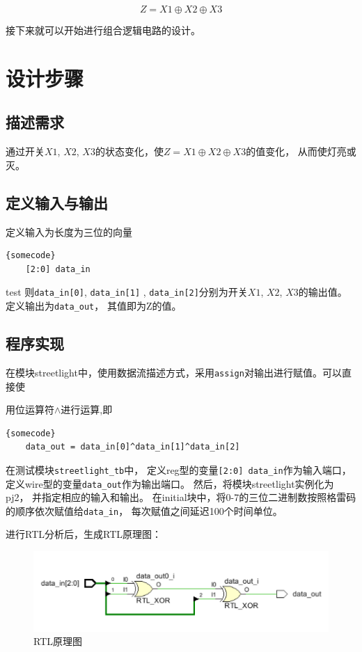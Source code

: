 \documentclass[UTF8]{article}
\begin{document}
$$Z = X1\oplus X2\oplus X3$$

接下来就可以开始进行组合逻辑电路的设计。

\section{设计步骤}
\subsection{描述需求}

通过开关$X1$, $X2$, $X3$的状态变化，使$Z = X1⊕X2⊕X3$的值变化，
从而使灯亮或灭。

\subsection{定义输入与输出}

定义输入为长度为三位的向量 

\lstset{language=verilog}
\begin{lstlisting}[frame=tb]{somecode}
    [2:0] data_in
\end{lstlisting}

{test}
则\lstinline{data_in[0]},
\lstinline$data_in[1]$ , \lstinline$data_in[2]$分别为开关$X1$, $X2$, $X3$的输出值。
定义输出为\lstinline$data_out$，
其值即为Z的值。

\subsection{程序实现}

在模块streetlight中，使用数据流描述方式，采用\lstinline{assign}对输出进行赋值。可以直接使

用位运算符$\wedge$进行运算,即
\lstset{language=verilog}
\begin{lstlisting}[frame=tb]{somecode}
    data_out = data_in[0]^data_in[1]^data_in[2]
\end{lstlisting}

在测试模块\lstinline{streetlight_tb}中，
定义reg型的变量\lstinline{[2:0] data_in}作为输入端口，
定义wire型的变量\lstinline{data_out}作为输出端口。
然后，将模块streetlight实例化为pj2，
并指定相应的输入和输出。
在initial块中，将0-7的三位二进制数按照格雷码的顺序依次赋值给\lstinline{data_in}，
每次赋值之间延迟100个时间单位。

进行RTL分析后，生成RTL原理图：
​
\begin{figure}[htbp]
    \centering
    \includegraphics[scale=0.7]{0.png}
    \caption{RTL原理图}
\end{figure}
\end{document}
